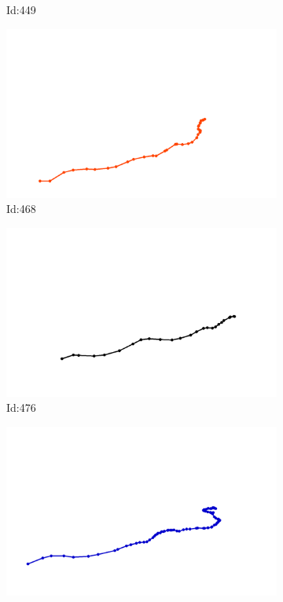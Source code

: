 \documentclass[12pt,twoside]{report}
\begin{document}
\begin{figure}
\begin{subfigure}[b]{0.20\textwidth}
\caption{Id:449}
\end{subfigure}
\begin{subfigure}[b]{0.20\textwidth}
\centering
\includegraphics[width=\textwidth]{../trajectories/468.png}
\caption{Id:468}
\end{subfigure}
\begin{subfigure}[b]{0.20\textwidth}
\centering
\includegraphics[width=\textwidth]{../trajectories/476.png}
\caption{Id:476}
\end{subfigure}
\begin{subfigure}[b]{0.20\textwidth}
\centering
\includegraphics[width=\textwidth]{../trajectories/480.png}

\end{subfigure}
\end{figure}
\end{document}
